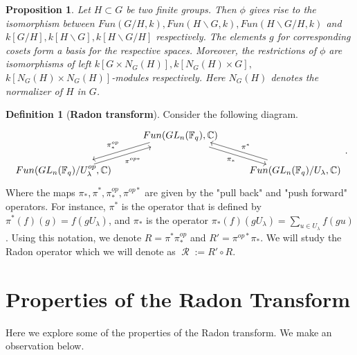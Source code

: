 \documentclass[12pt,reqno]{amsart}
\newtheorem{prop}[thm]{Proposition}
\theoremstyle{definition}
\newtheorem{defn}[thm]{Definition}
\theoremstyle{remark}
\numberwithin{equation}{section}
\DeclareMathOperator{\R}{\mathcal{R}}
\def\IM#1{\textcolor[rgb]{0.00,0.00,0.75}{[I: #1]}}
\begin{document}
\begin{prop}\label{convol_Hecke_mod}
    Let $H\subset G$ be two finite groups. Then $\phi$ gives rise to the isomorphism between $Fun(G/H,k)  , Fun(H\backslash G,k) ,  Fun(H\backslash G/H,k)$ and $k[G/H]  , k[H\backslash G] ,  k[H\backslash G/H]$ respectively. The elements $g$ for corresponding cosets form a basis for the respective spaces. Moreover, the restrictions of $\phi$ are isomorphisms of left $k[G \times N_G(H)]  , k[N_G(H)\times G] ,$ $k[N_G(H)\times N_G(H)]$-modules respectively. Here $N_G(H)$ denotes the normalizer of $H$ in $G$.
\end{prop}

\begin{defn}[{\bf Radon transform}]\label{Radon_transform}
    Consider the following diagram. %
    \begin{equation*}
        \begin{tikzcd}
            & {Fun(GL_n(\mathbb{F}_q),\mathbb{C})} \arrow[rd, "\pi_*"', shift right] \arrow[ld, "\pi^{op}_*"', shift right] & \\
            {Fun(GL_n(\mathbb{F}_q)/U_{\lambda}^{op},\mathbb{C})} \arrow[ru, "\pi^{op *}"', shift right] &                                                                                                               & {Fun(GL_n(\mathbb{F}_q)/U_{\lambda},\mathbb{C})} \arrow[lu, "\pi^*"', shift right]
        \end{tikzcd}
.
    \end{equation*}
    Where the maps $\pi_*,\pi^*,\pi_*^{op},\pi^{op*}$ are given by the "pull back" and "push forward" operators. For instance, $\pi^*$ is the operator that is defined by $\pi^*(f)(g) = f(gU_\lambda)$, and $\pi_*$ is the operator $\pi_*(f)(gU_\lambda) = \sum_{u \in U_\lambda} f(gu)$. Using this notation, we denote $R = \pi^{*} \pi^{op}_*$ and $R' = \pi^{op*} \pi_*$. We will study the Radon operator which we will denote as $\R:=R' \circ R$.
\end{defn}


\section{Properties of the Radon Transform}

Here we explore some of the properties of the Radon transform. We make an observation below.\\
\end{document}
